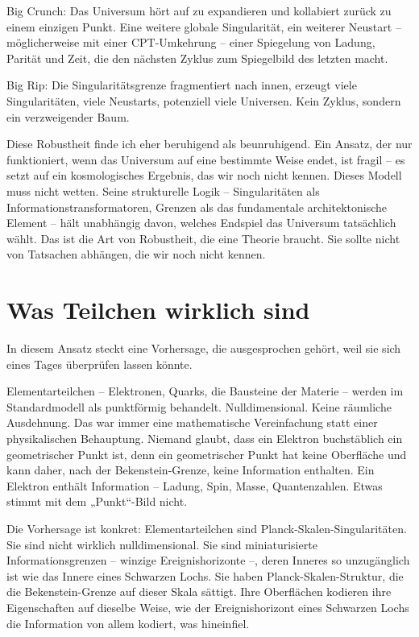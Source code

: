 \documentclass[11pt, twoside, openright]{book}
\begin{document}
Big Crunch: Das Universum hört auf zu expandieren und kollabiert zurück zu einem einzigen Punkt. Eine weitere globale Singularität, ein weiterer Neustart -- möglicherweise mit einer CPT-Umkehrung -- einer Spiegelung von Ladung, Parität und Zeit, die den nächsten Zyklus zum Spiegelbild des letzten macht.

Big Rip: Die Singularitätsgrenze fragmentiert nach innen, erzeugt viele Singularitäten, viele Neustarts, potenziell viele Universen. Kein Zyklus, sondern ein verzweigender Baum.

Diese Robustheit finde ich eher beruhigend als beunruhigend. Ein Ansatz, der nur funktioniert, wenn das Universum auf eine bestimmte Weise endet, ist fragil -- es setzt auf ein kosmologisches Ergebnis, das wir noch nicht kennen. Dieses Modell muss nicht wetten. Seine strukturelle Logik -- Singularitäten als Informationstransformatoren, Grenzen als das fundamentale architektonische Element -- hält unabhängig davon, welches Endspiel das Universum tatsächlich wählt. Das ist die Art von Robustheit, die eine Theorie braucht. Sie sollte nicht von Tatsachen abhängen, die wir noch nicht kennen.


\section*{Was Teilchen wirklich sind}

In diesem Ansatz steckt eine Vorhersage, die ausgesprochen gehört, weil sie sich eines Tages überprüfen lassen könnte.

Elementarteilchen -- Elektronen, Quarks, die Bausteine der Materie -- werden im Standardmodell als punktförmig behandelt. Nulldimensional. Keine räumliche Ausdehnung. Das war immer eine mathematische Vereinfachung statt einer physikalischen Behauptung. Niemand glaubt, dass ein Elektron buchstäblich ein geometrischer Punkt ist, denn ein geometrischer Punkt hat keine Oberfläche und kann daher, nach der Bekenstein-Grenze, keine Information enthalten. Ein Elektron enthält Information -- Ladung, Spin, Masse, Quantenzahlen. Etwas stimmt mit dem „Punkt“-Bild nicht.

Die Vorhersage ist konkret: Elementarteilchen sind Planck-Skalen-Singularitäten. Sie sind nicht wirklich nulldimensional. Sie sind miniaturisierte Informationsgrenzen -- winzige Ereignishorizonte --, deren Inneres so unzugänglich ist wie das Innere eines Schwarzen Lochs. Sie haben Planck-Skalen-Struktur, die die Bekenstein-Grenze auf dieser Skala sättigt. Ihre Oberflächen kodieren ihre Eigenschaften auf dieselbe Weise, wie der Ereignishorizont eines Schwarzen Lochs die Information von allem kodiert, was hineinfiel.
\end{document}
